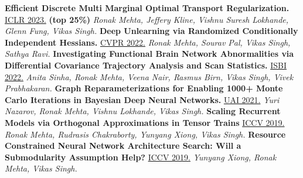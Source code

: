 \documentclass[]{article}
\begin{document}
\noindent
{\bf Efficient Discrete Multi Marginal Optimal Transport Regularization.}
\newline
\href{https://openreview.net/forum?id=R98ZfMt-jE}{ICLR 2023.}
\textbf{(top 25\%)} \textit{Ronak Mehta, Jeffery Kline, Vishnu Suresh Lokhande, Glenn Fung, Vikas Singh.}
\newline\newline
{\bf Deep Unlearning via Randomized Conditionally Independent Hessians.}
\newline
\href{https://openaccess.thecvf.com/content/CVPR2022/html/Mehta_Deep_Unlearning_via_Randomized_Conditionally_Independent_Hessians_CVPR_2022_paper.html}{CVPR 2022.}
\textit{Ronak Mehta, Sourav Pal, Vikas Singh, Sathya Ravi.}
\newline\newline
{\bf Investigating Functional Brain Network Abnormalities via Differential Covariance Trajectory Analysis and Scan Statistics.}
\newline
\href{https://ieeexplore.ieee.org/document/9761442}{ISBI 2022.}
\textit{Anita Sinha, Ronak Mehta, Veena Nair, Rasmus Birn, Vikas Singh, Vivek Prabhakaran.}
\newline\newline
{\bf Graph Reparameterizations for Enabling 1000+ Monte Carlo Iterations in Bayesian Deep Neural Networks.}
\newline
\href{https://proceedings.mlr.press/v161/nazarovs21b.html}{UAI 2021.}
\textit{Yuri Nazarov, Ronak Mehta, Vishnu Lokhande, Vikas Singh.}
\newline\newline
{\bf Scaling Recurrent Models via Orthogonal Approximations in Tensor Trains}
\newline
\href{http://openaccess.thecvf.com/content_ICCV_2019/html/Mehta_Scaling_Recurrent_Models_via_Orthogonal_Approximations_in_Tensor_Trains_ICCV_2019_paper.html}{ICCV 2019.}
\textit{Ronak Mehta, Rudrasis Chakraborty, Yunyang Xiong, Vikas Singh.}
\newline\newline
{\bf Resource Constrained Neural Network Architecture Search: Will a Submodularity Assumption Help?}
\newline
\href{http://openaccess.thecvf.com/content_ICCV_2019/html/Xiong_Resource_Constrained_Neural_Network_Architecture_Search_Will_a_Submodularity_Assumption_ICCV_2019_paper.html}{ICCV 2019.}
\textit{Yunyang Xiong, Ronak Mehta, Vikas Singh.}
\newline\newline
\end{document}
